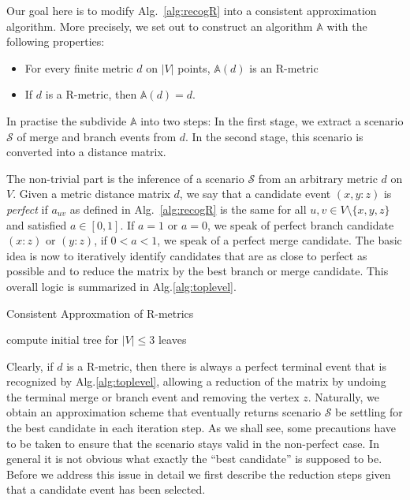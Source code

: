 \documentclass{article}
\newcommand{\NR}[1]{\begingroup\color{orange}#1\endgroup}
\begin{document}
Our goal here is to modify Alg.~\ref{alg:recogR} into a consistent
approximation algorithm. More precisely, we set out to construct an
algorithm $\mathbb{A}$ with the following properties:
\begin{itemize} 
  \item For every finite metric $d$ on $|V|$ points, $\mathbb{A}(d)$ 
    is an R-metric
  \item If $d$ \NR{is a} R-metric, then $\mathbb{A}(d)=d$. 
\end{itemize} 
In practise the subdivide $\mathbb{A}$ into two steps: In the first stage,
we extract a scenario $\mathcal{S}$ of merge and branch events from $d$. In
the second stage, this scenario is converted into a distance
matrix. 

The non-trivial part is the inference of a scenario $\mathcal{S}$ from an
arbitrary metric $d$ on $V$. Given a metric distance matrix $d$, we say
that a candidate event $(x,y:z)$ is \emph{perfect} if $a_{uv}$ as defined
in Alg.~\ref{alg:recogR} is the same for all $u,v\in V\setminus\{x,y,z\}$
and satisfied $a\in [0,1]$. If $a=1$ or $a=0$, we speak of perfect branch
candidate $(x:z)$ or $(y:z)$, if $0<a<1$, we speak of a perfect merge
candidate. The basic idea is now to iteratively identify candidates that
are as close to perfect as possible and to reduce the matrix by the best
branch or merge candidate. This overall logic is summarized in
Alg.\ref{alg:toplevel}.

\begin{algorithm}[H]
\caption{Consistent Approxmation of R-metrics}
\label{alg:toplevel}
 \SetAlgoLined
 compute initial tree for $|V|\le 3$ leaves\;
\end{algorithm} 

Clearly, if $d$ is a R-metric, then there is always a perfect terminal
event that is recognized by Alg.\ref{alg:toplevel}, allowing a reduction of
the matrix by undoing the terminal merge or branch event and removing the
vertex $z$. Naturally, we obtain an approximation scheme that eventually
returns scenario $\mathcal{S}$ be settling for the best candidate in each
iteration step. As we shall see, some precautions have to be taken to
ensure that the scenario stays valid in the non-perfect case.  In general
it is not obvious what exactly the ``best candidate'' is supposed to
be. Before we address this issue in detail we first describe the reduction
steps given that a candidate event has been selected.
\end{document}
